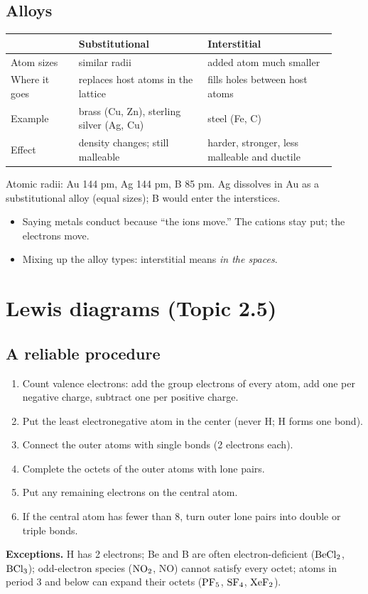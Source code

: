 \documentclass[11pt]{article}
\begin{document}
\subsection{Alloys}
\begin{center}
\begin{tabular}{p{0.19\linewidth}p{0.36\linewidth}p{0.36\linewidth}}\toprule
& Substitutional & Interstitial \\ \midrule
Atom sizes & similar radii & added atom much smaller \\
Where it goes & replaces host atoms in the lattice & fills holes between host atoms \\
Example & brass (Cu, Zn), sterling silver (Ag, Cu) & steel (Fe, C) \\
Effect & density changes; still malleable & harder, stronger, less malleable and ductile \\ \bottomrule
\end{tabular}
\end{center}

 Atomic radii: Au 144 pm, Ag 144 pm, B 85 pm. Ag dissolves in Au as a substitutional alloy (equal sizes); B would enter the interstices.

\errorsh
\begin{itemize}
\item Saying metals conduct because ``the ions move.'' The cations stay put; the electrons move.
\item Mixing up the alloy types: interstitial means \emph{in the spaces}.
\end{itemize}

\section{Lewis diagrams (Topic 2.5)}\label{t:2.5}
\subsection{A reliable procedure}
\begin{enumerate}
\item Count valence electrons: add the group electrons of every atom, add one per negative charge, subtract one per positive charge.
\item Put the least electronegative atom in the center (never H; H forms one bond).
\item Connect the outer atoms with single bonds (2 electrons each).
\item Complete the octets of the outer atoms with lone pairs.
\item Put any remaining electrons on the central atom.
\item If the central atom has fewer than 8, turn outer lone pairs into double or triple bonds.
\end{enumerate}
\textbf{Exceptions.} H has 2 electrons; Be and B are often electron-deficient ($\ce{BeCl2}$, $\ce{BCl3}$); odd-electron species ($\ce{NO2}$, NO) cannot satisfy every octet; atoms in period 3 and below can expand their octets ($\ce{PF5}$, $\ce{SF4}$, $\ce{XeF2}$).
\end{document}
